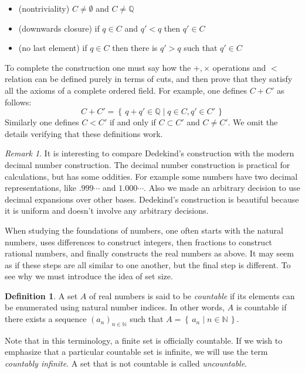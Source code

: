 \documentclass[11pt,oneside]{amsbook}
\newcommand{\set}[1]{\left\{\,#1\,\right\}}
\newcommand{\N}{\mathbb N}
\newcommand{\Q}{\mathbb Q}
\theoremstyle{definition}
\theoremstyle{plain}
\theoremstyle{definition}
\newtheorem{definition}[theorem]{Definition}
\theoremstyle{remark}
\newtheorem{remark}[theorem]{Remark}
\numberwithin{equation}{section}
\numberwithin{figure}{section}
\begin{document}
\begin{itemize}
  \item (nontriviality) $C\neq\emptyset$ and $C\neq\Q$
  \item (downwards closure) if $q\in C$ and $q'<q$ then $q'\in C$
  \item (no last element) if $q\in C$ then there is $q'>q$ such that $q'\in C$
\end{itemize}

To complete the construction one must say how the $+,\times$ operations and $<$ relation can be defined purely in terms of cuts, and then prove that they satisfy all the axioms of a complete ordered field. For example, one defines $C+C'$ as follows:
\[C+C'=\set{q+q'\in\Q\mid q\in C,q'\in C'}
\]
Similarly one defines $C<C'$ if and only if $C\subset C'$ and $C\neq C'$. We omit the details verifying that these definitions work.

\begin{remark}
  It is interesting to compare Dedekind's construction with the modern decimal number construction. The decimal number construction is practical for calculations, but has some oddities. For example some numbers have two decimal representations, like $.999\cdots$ and $1.000\cdots$. Also we made an arbitrary decision to use decimal expansions over other bases. Dedekind's construction is beautiful because it is uniform and doesn't involve any arbitrary decisions.
\end{remark}

When studying the foundations of numbers, one often starts with the natural numbers, uses differences to construct integers, then fractions to construct rational numbers, and finally constructs the real numbers as above. It may seem as if these steps are all similar to one another, but the final step is different. To see why we must introduce the idea of set size.

\begin{definition}
  A set $A$ of real numbers is said to be \emph{countable} if its elements can be enumerated using natural number indices. In other words, $A$ is countable if there exists a sequence $(a_n)_{n\in\N}$ such that $A=\set{a_n\mid n\in\N}$.
\end{definition}

Note that in this terminology, a finite set is officially countable. If we wish to emphasize that a particular countable set is infinite, we will use the term \emph{countably infinite}. A set that is not countable is called \emph{uncountable}.
\end{document}

